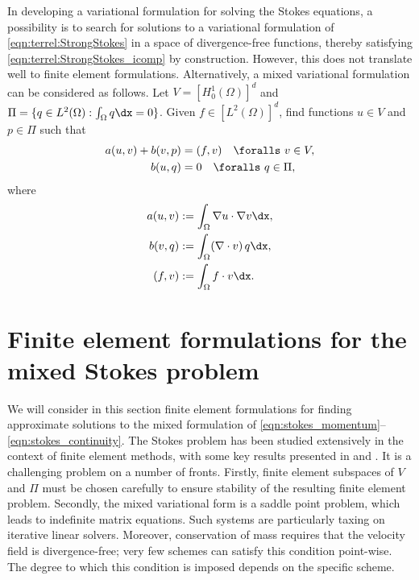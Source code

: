 In developing a variational formulation for solving the Stokes equations,
a possibility is to search for solutions to a variational formulation of
\eqref{eqn:terrel:StrongStokes} in a space of divergence-free functions,
thereby satisfying \eqref{eqn:terrel:StrongStokes_icomp} by construction.
However, this does not translate well to finite element
formulations. Alternatively, a mixed variational formulation can be
considered as follows. Let $V = [H^{1}_{0}(\Omega)]^d$ and $\Pi = \{q \in
L^2(\Omega) : \int_\Omega q \dx = 0\}$.  Given $f \in [L^{2}(\Omega)]^d$,
find functions $u \in V$ and $p \in \Pi$ such that
%
\begin{align}
    a(u, v) + b(v, p)  &=  (f, v) \quad \foralls \ v \in V,
\label{eqn:stokes_momentum}
\\
    b(u, q) &= 0 \quad \foralls \ q \in \Pi,
\label{eqn:stokes_continuity}
\end{align}
%
where
%
\begin{align}
  a(u, v) &:= \int_\Omega \nabla{u} \cdot \nabla v \dx,
\\
  b(v, q) &:= \int_\Omega (\nabla\cdot v) \, q \dx,
\\
  (f, v) &:= \int_\Omega f \cdot v \dx.
\end{align}
\section{Finite element formulations for the mixed Stokes problem}

We will consider in this section finite element formulations
for finding approximate solutions to the mixed formulation of
\eqref{eqn:stokes_momentum}--\eqref{eqn:stokes_continuity}.  The Stokes
problem has been studied extensively in the context of finite element
methods, with some key results presented in \citet{BrezziFortin1991}
and \citet{BrennerScott2008}.  It is a challenging problem on a number
of fronts.  Firstly, finite element subspaces of $V$ and $\Pi$ must be
chosen carefully to ensure stability of the resulting finite element
problem. Secondly, the mixed variational form is a saddle point problem,
which leads to indefinite matrix equations. Such systems are particularly
taxing on iterative linear solvers.  Moreover, conservation of mass
requires that the velocity field is divergence-free; very few schemes can
satisfy this condition point-wise.  The degree to which this condition
is imposed depends on the specific scheme.

